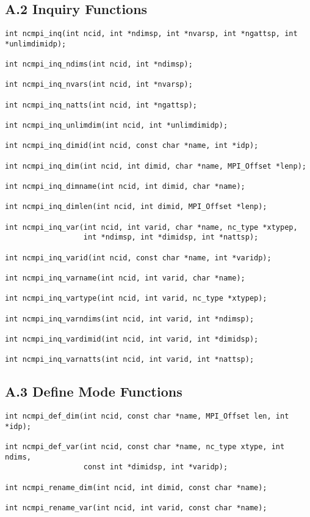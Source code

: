 \documentclass[10pt]{article}
\begin{document}
%
%
\subsection*{A.2  Inquiry Functions}

\begin{verbatim}
int ncmpi_inq(int ncid, int *ndimsp, int *nvarsp, int *ngattsp, int *unlimdimidp); 

int ncmpi_inq_ndims(int ncid, int *ndimsp);

int ncmpi_inq_nvars(int ncid, int *nvarsp);

int ncmpi_inq_natts(int ncid, int *ngattsp);

int ncmpi_inq_unlimdim(int ncid, int *unlimdimidp);

int ncmpi_inq_dimid(int ncid, const char *name, int *idp);

int ncmpi_inq_dim(int ncid, int dimid, char *name, MPI_Offset *lenp);

int ncmpi_inq_dimname(int ncid, int dimid, char *name);

int ncmpi_inq_dimlen(int ncid, int dimid, MPI_Offset *lenp);

int ncmpi_inq_var(int ncid, int varid, char *name, nc_type *xtypep, 
                  int *ndimsp, int *dimidsp, int *nattsp);

int ncmpi_inq_varid(int ncid, const char *name, int *varidp);

int ncmpi_inq_varname(int ncid, int varid, char *name);

int ncmpi_inq_vartype(int ncid, int varid, nc_type *xtypep);

int ncmpi_inq_varndims(int ncid, int varid, int *ndimsp);

int ncmpi_inq_vardimid(int ncid, int varid, int *dimidsp);

int ncmpi_inq_varnatts(int ncid, int varid, int *nattsp);

\end{verbatim}

%
%
\subsection*{A.3  Define Mode Functions}

\begin{verbatim}
int ncmpi_def_dim(int ncid, const char *name, MPI_Offset len, int *idp);

int ncmpi_def_var(int ncid, const char *name, nc_type xtype, int ndims, 
                  const int *dimidsp, int *varidp);

int ncmpi_rename_dim(int ncid, int dimid, const char *name);

int ncmpi_rename_var(int ncid, int varid, const char *name);

\end{verbatim}
%
%
\end{document}

